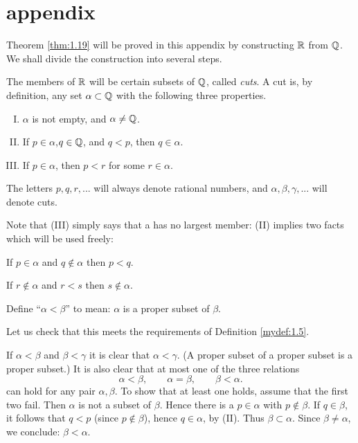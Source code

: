 \section*{appendix}
Theorem \ref{thm:1.19} will be proved in this appendix 
by constructing ${\protect\mathbb R}$ from ${\protect\mathbb Q}$. 
We shall divide the construction into several steps.

The members of ${\protect\mathbb R}$ will be certain subsets of ${\protect\mathbb Q}$, called \emph{cuts}. 
A cut is, by definition, 
any set $\alpha \subset {\protect\mathbb Q}$ with the following three properties.
\begin{enumerate}[(I)]
    \item $\alpha$ is not empty, and $\alpha \neq {\protect\mathbb Q}$.
    \item If $p\in \alpha$,$q \in {\protect\mathbb Q}$, and $q <p$, then $q \in \alpha$.
    \item If $p \in \alpha$, then $p <r$ for some $r\in \alpha$.
\end{enumerate}

The letters $p, q, r, ...$ will always denote rational numbers, 
and $\alpha, \beta, \gamma, ...$ will denote cuts.

Note that (III) simply says that a has no largest member: 
(II) implies two facts which will be used freely:

If $p\in\alpha$ and $q\not\in\alpha$ then $p<q$.

If $r\not\in \alpha$ and $r<s$ then $s\not\in \alpha$.

Define ``$\alpha < \beta$'' to mean: 
$\alpha$ is a proper subset of $\beta$.

Let us check that this meets the requirements of Definition \ref{mydef:1.5}.

If $\alpha < \beta$ and $\beta < \gamma$ it is clear that $\alpha < \gamma$. 
(A proper subset of a proper subset is a proper subset.) 
It is also clear that at most one of the three relations
\begin{equation*}
    \alpha < \beta, \qquad
    \alpha = \beta, \qquad
    \beta < \alpha.
\end{equation*}
can hold for any pair $\alpha, \beta$. 
To show that at least one holds, assume that the first two fail. 
Then $\alpha$ is not a subset of $\beta$. 
Hence there is a $p \in \alpha$ with $p \not\in \beta$. 
If $q \in \beta$, it follows that $q <p$ (since $p \not\in \beta$), 
hence $q \in \alpha$, by (II). 
Thus $\beta \subset \alpha$. 
Since $\beta \neq \alpha$, we conclude: $\beta < \alpha$.

